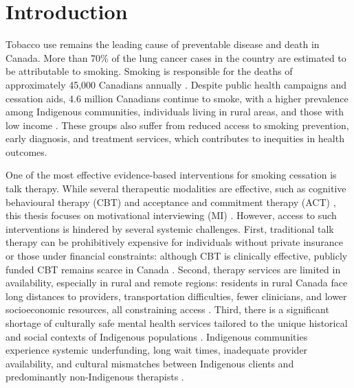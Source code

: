\chapter{Introduction}


Tobacco use remains the leading cause of preventable disease and death in Canada. More than 70\% of the lung cancer cases in the country are estimated to be attributable to smoking. Smoking is responsible for the deaths of approximately 45,000 Canadians annually \citep{poirier2019estimates}. Despite public health campaigns and cessation aids, 4.6 million Canadians continue to smoke, with a higher prevalence among Indigenous communities, individuals living in rural areas, and those with low income \cite{cpac2020lung}. These groups also suffer from reduced access to smoking prevention, early diagnosis, and treatment services, which contributes to inequities in health outcomes.

One of the most effective evidence-based interventions for smoking cessation is talk therapy. While several therapeutic modalities are effective, such as cognitive behavioural therapy (CBT) \cite{beck2011cognitive} and acceptance and commitment therapy (ACT) \cite{hayes1999acceptance}, this thesis focuses on motivational interviewing (MI) \cite{MillerRollnick2023}. However, access to such interventions is hindered by several systemic challenges. First, traditional talk therapy can be prohibitively expensive for individuals without private insurance or those under financial constraints: although CBT is clinically effective, publicly funded CBT remains scarce in Canada \cite{doi:10.1177/0253717620957496,doi:10.1177/0706743716642416}. Second, therapy services are limited in availability, especially in rural and remote regions: residents in rural Canada face long distances to providers, transportation difficulties, fewer clinicians, and lower socioeconomic resources, all constraining access \cite{burns2007rural,james2021improving}. Third, there is a significant shortage of culturally safe mental health services tailored to the unique historical and social contexts of Indigenous populations \cite{josewski2023improving,hartwasekeesikaw2009cultural}. Indigenous communities experience systemic underfunding, long wait times, inadequate provider availability, and cultural mismatches between Indigenous clients and predominantly non-Indigenous therapists \cite{turner2018poverty}.



